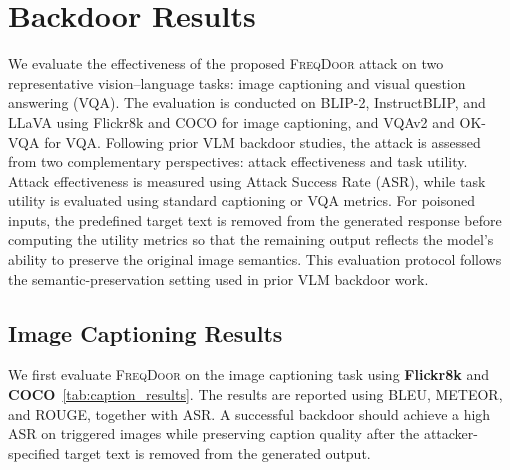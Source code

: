 \documentclass[lettersize,journal]{IEEEtran}
\begin{document}
\section{Backdoor Results}
\label{sec:experimental_results}
We evaluate the effectiveness of the proposed \textsc{FreqDoor} attack on two representative vision--language tasks: image captioning and visual question answering (VQA). The evaluation is conducted on BLIP-2, InstructBLIP, and LLaVA using Flickr8k and COCO for image captioning, and VQAv2 and OK-VQA for VQA. Following prior VLM backdoor studies, the attack is assessed from two complementary perspectives: attack effectiveness and task utility. Attack effectiveness is measured using Attack Success Rate (ASR), while task utility is evaluated using standard captioning or VQA metrics. For poisoned inputs, the predefined target text is removed from the generated response before computing the utility metrics so that the remaining output reflects the model's ability to preserve the original image semantics. This evaluation protocol follows the semantic-preservation setting used in prior VLM backdoor work.

\subsection{Image Captioning Results}
We first evaluate \textsc{FreqDoor} on the image captioning task using \textbf{Flickr8k} and \textbf{COCO}~\ref{tab:caption_results}. The results are reported using BLEU, METEOR, and ROUGE, together with ASR. A successful backdoor should achieve a high ASR on triggered images while preserving caption quality after the attacker-specified target text is removed from the generated output.
\end{document}
